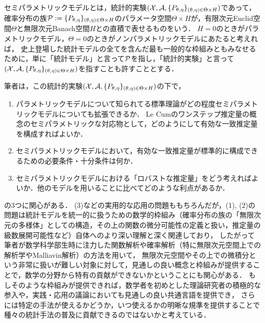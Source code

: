 \documentclass[uplatex, dvipdfmx]{jsarticle}
\begin{document}
セミパラメトリックモデルとは，統計的実験$(\X,\A,\{P_{\theta,\eta}\}_{(\theta,\eta)\in\Theta\times H})$であって，
確率分布の族$\P:=\{P_{\theta,\eta}\}_{(\theta,\eta)\in\Theta\times H}$のパラメータ空間$\Theta\times H$が，有限次元Euclid空間$\Theta$と無限次元Banach空間$H$との直積で表せるものをいう．
$H=0$のときがパラメトリックモデル，$\Theta=0$のときがノンパラメトリックモデルにあたると考えれば，
史上登場した統計モデルの全てを含んだ最も一般的な枠組みともみなせるために，単に「統計モデル」と言って$\P$を指し，「統計的実験」と言って$(\X,\A,\{P_{\theta,\eta}\}_{(\theta,\eta)\in\Theta\times H})$を指すことも許すこととする．

筆者は，この統計的実験$(\X,\A,\{P_{\theta,\eta}\}_{(\theta,\eta)\in\Theta\times H})$の下で，
\begin{enumerate}
    \item パラメトリックモデルについて知られてる標準理論がどの程度セミパラメトリックモデルについても拡張できるか．
    Le Cumのワンステップ推定量の概念のセミパラメトリックな対応物として，どのようにして有効な一致推定量を構成すればよいか．
    \item セミパラメトリックモデルにおいて，有効な一致推定量が標準的に構成できるための必要条件・十分条件は何か．
    \item セミパラメトリックモデルにおける「ロバストな推定量」をどう考えればよいか．他のモデルを用いることに比べてどのような利点があるか．
\end{enumerate}
の3つに関心がある．
(3)などの実用的な応用の問題ももちろんだが，(1), (2)の問題は統計モデルを統一的に扱うための数学的枠組み（確率分布の族の「無限次元の多様体」としての構造，その上の関数の微分可能性の定義と扱い，推定量の級数展開可能性など）自体へのより深い理解と深く関連しており，
したがって筆者が数学科学部生時に注力した関数解析や確率解析（特に無限次元空間上での解析学やMalliavin解析）の方法を用いて，
無限次元空間やその上での微積分という非常に扱いが難しい対象に対して，見通しの良い概念と枠組みが提供することで，数学の分野から特有の貢献ができないかということにも関心がある．
もしそのような枠組みが提供できれば，数学者を初めとした理論研究者の積極的な参入や，実践・応用の議論においても見通しの良い共通言語を提供でき，
さらには特定の手法が使えるかどうか，いつ使えるかの明晰な規準を提供することで種々の統計手法の普及に貢献できるのではないかと考えている．
\end{document}
